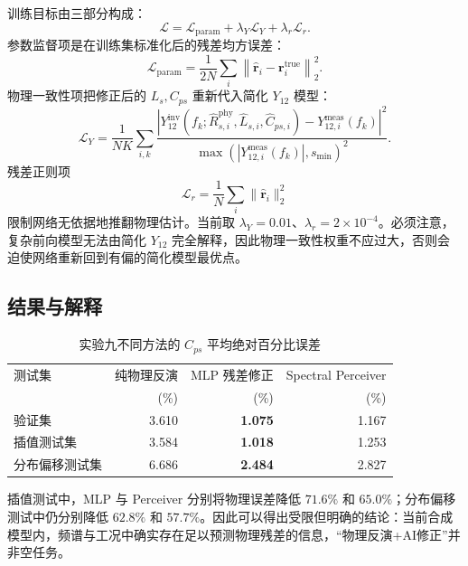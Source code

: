 \documentclass[UTF8,a4paper,12pt]{ctexart}
\begin{document}
训练目标由三部分构成：
\begin{equation}
\mathcal L=
\mathcal L_{\mathrm{param}}
+\lambda_Y\mathcal L_Y
+\lambda_r\mathcal L_r.
\end{equation}
参数监督项是在训练集标准化后的残差均方误差：
\begin{equation}
\mathcal L_{\mathrm{param}}=
\frac{1}{2N}\sum_i
\left\|\hat{\mathbf r}_i-\mathbf r_i^{\mathrm{true}}\right\|_2^2.
\end{equation}
物理一致性项把修正后的 $L_s,C_{ps}$ 重新代入简化 $Y_{12}$ 模型：
\begin{equation}
\mathcal L_Y=\frac{1}{NK}\sum_{i,k}
\frac{|Y_{12}^{\mathrm{inv}}(f_k;\hat R_{s,i}^{\mathrm{phy}},\hat L_{s,i},\hat C_{ps,i})
-Y_{12,i}^{\mathrm{meas}}(f_k)|^2}
{\max(|Y_{12,i}^{\mathrm{meas}}(f_k)|,s_{\min})^2}.
\end{equation}
残差正则项
\begin{equation}
\mathcal L_r=\frac{1}{N}\sum_i\|\hat{\mathbf r}_i\|_2^2
\end{equation}
限制网络无依据地推翻物理估计。当前取 $\lambda_Y=0.01$、$\lambda_r=2\times10^{-4}$。必须注意，复杂前向模型无法由简化 $Y_{12}$ 完全解释，因此物理一致性权重不应过大，否则会迫使网络重新回到有偏的简化模型最优点。

\subsection{结果与解释}

\begin{table}[H]
\centering
\caption{实验九不同方法的 $C_{ps}$ 平均绝对百分比误差}
\begin{tabular}{lrrr}
\toprule
测试集 & 纯物理反演 & MLP 残差修正 & Spectral Perceiver \\
 & (\%) & (\%) & (\%) \\
\midrule
验证集 & 3.610 & \textbf{1.075} & 1.167 \\
插值测试集 & 3.584 & \textbf{1.018} & 1.253 \\
分布偏移测试集 & 6.686 & \textbf{2.484} & 2.827 \\
\bottomrule
\end{tabular}
\end{table}

插值测试中，MLP 与 Perceiver 分别将物理误差降低 $71.6\%$ 和 $65.0\%$；分布偏移测试中仍分别降低 $62.8\%$ 和 $57.7\%$。因此可以得出受限但明确的结论：当前合成模型内，频谱与工况中确实存在足以预测物理残差的信息，“物理反演+AI修正”并非空任务。
\end{document}
